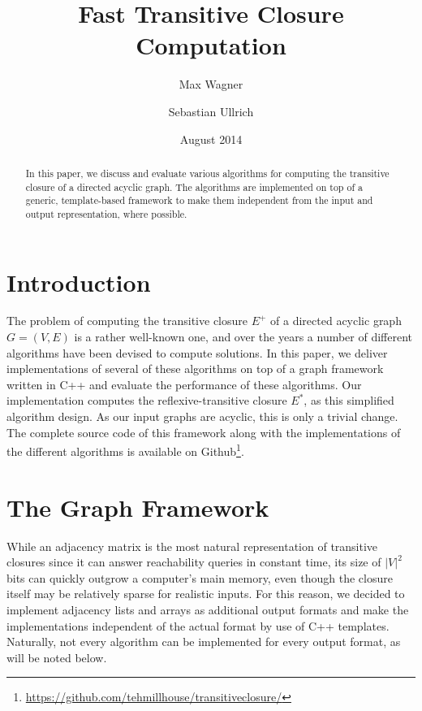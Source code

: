 \documentclass[12pt,a4paper,twoside]{article}
\begin{document}
\title{Fast Transitive Closure Computation}
\author{Max Wagner \and Sebastian Ullrich}
\date{August 2014}
\maketitle

\def\sectionautorefname{Section}
\def\subsectionautorefname{Subsection}

\newcommand\ie{i.e.\ }
\newcommand\eg{e.g.,\ }
\newcommand\credits[1]{\begin{flushright}\emph{#1}\end{flushright}}
\newcommand\abs[1]{\left|#1\right|}
\newcommand\BigOh[1]{\mathcal{O}\left(#1\right)}

\begin{abstract}
  In this paper, we discuss and evaluate various algorithms for computing the transitive closure of a directed acyclic graph. The algorithms are implemented on top of a generic, template-based framework to make them independent from the input and output representation, where possible.
\end{abstract}

\section{Introduction}

The problem of computing the transitive closure $E^+$ of a directed acyclic graph $G = (V,E)$ is a rather well-known one, and over the years a number of different algorithms have been devised to compute solutions. In this paper, we deliver implementations of several of these algorithms on top of a graph framework written in C++ and evaluate the performance of these algorithms. Our implementation computes the reflexive-transitive closure $E^*$, as this simplified algorithm design. As our input graphs are acyclic, this is only a trivial change. The complete source code of this framework along with the implementations of the different algorithms is available on Github\footnote{\url{https://github.com/tehmillhouse/transitiveclosure/}}.

\section{The Graph Framework}

While an adjacency matrix is the most natural representation of transitive closures since it can answer reachability queries in constant time, its size of $\abs{V}^2$ bits can quickly outgrow a computer's main memory, even though the closure itself may be relatively sparse for realistic inputs. For this reason, we decided to implement adjacency lists and arrays as additional output formats and make the implementations independent of the actual format by use of C++ templates. Naturally, not every algorithm can be implemented for every output format, as will be noted below.
\end{document}
